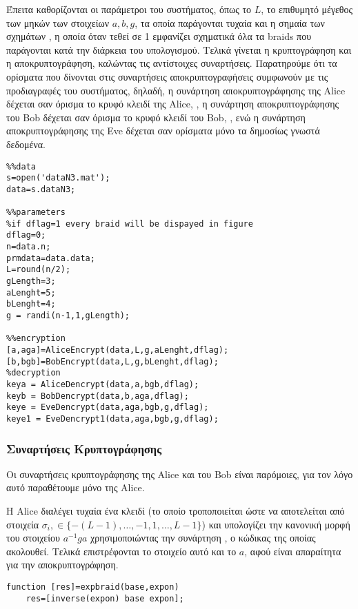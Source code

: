 Έπειτα καθορίζονται οι παράμετροι του συστήματος, όπως το $ L $, το επιθυμητό μέγεθος των μηκών των στοιχείων $ a,b,g $, τα οποία παράγονται τυχαία και η σημαία των σχημάτων , η οποία όταν τεθεί σε 1 εμφανίζει σχηματικά όλα τα braids που παράγονται κατά την διάρκεια του υπολογισμού. 
Τελικά γίνεται η κρυπτογράφηση και η αποκρυπτογράφηση, καλώντας τις αντίστοιχες συναρτήσεις. Παρατηρούμε ότι τα ορίσματα που δίνονται στις συναρτήσεις αποκρυπτογραφήσεις συμφωνούν με τις προδιαγραφές του συστήματος, δηλαδή, η συνάρτηση αποκρυπτογράφησης της Alice δέχεται σαν όρισμα το κρυφό κλειδί της Alice, , η συνάρτηση αποκρυπτογράφησης του Bob δέχεται σαν όρισμα το κρυφό κλειδί του Bob, , ενώ η συνάρτηση αποκρυπτογράφησης της Eve δέχεται σαν ορίσματα μόνο τα δημοσίως γνωστά δεδομένα.  
\begin{lstlisting}
%%data
s=open('dataN3.mat');
data=s.dataN3;

%%parameters
%if dflag=1 every braid will be dispayed in figure
dflag=0;
n=data.n;
prmdata=data.data;
L=round(n/2);
gLength=3;
aLenght=5;
bLenght=4;
g = randi(n-1,1,gLength);

%%encryption
[a,aga]=AliceEncrypt(data,L,g,aLenght,dflag);
[b,bgb]=BobEncrypt(data,L,g,bLenght,dflag);
%decryption
keya = AliceDencrypt(data,a,bgb,dflag);
keyb = BobDencrypt(data,b,aga,dflag);
keye = EveDencrypt(data,aga,bgb,g,dflag);
keye1 = EveDencrypt1(data,aga,bgb,g,dflag);
\end{lstlisting}

\subsubsection{Συναρτήσεις Κρυπτογράφησης}

Οι συναρτήσεις κρυπτογράφησης της Alice και του Bob είναι παρόμοιες, για τον λόγο αυτό παραθέτουμε μόνο της Alice.

Η Alice διαλέγει τυχαία ένα κλειδί (το οποίο τροποποιείται ώστε να αποτελείται από στοιχεία $ \sigma_i,\in \{ -(L-1),\dots,-1,1,\dots,L-1 \} $) και υπολογίζει την κανονική μορφή του στοιχείου $ a^{-1}ga $ χρησιμοποιώντας την συνάρτηση , ο κώδικας της οποίας ακολουθεί. Τελικά επιστρέφονται το στοιχείο αυτό και το $ a $, αφού είναι απαραίτητα για την αποκρυπτογράφηση.

\begin{lstlisting}
function [res]=expbraid(base,expon)
    res=[inverse(expon) base expon];
\end{lstlisting}


